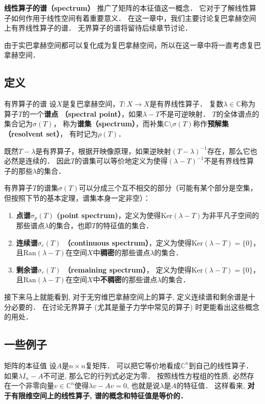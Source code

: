 
\textbf{线性算子的谱（spectrum）} 推广了矩阵的本征值这一概念． 它对于了解线性算子如何作用于线性空间有着重要意义． 在这一章中，我们主要讨论复巴拿赫空间上有界线性算子的谱． 无界算子的谱将留待后续章节讨论．

由于实巴拿赫空间都可以复化成为复巴拿赫空间，所以在这一章中将一直考虑复巴拿赫空间．

\subsection{定义}
\begin{definition}{有界算子的谱}
设$X$是复巴拿赫空间，$T:X\to X$是有界线性算子． 复数$\lambda\in\mathbb{C}$称为算子$T$的一个\textbf{谱点 （spectral point）}，如果$\lambda-T$不是可逆映射． $T$的全体谱点的集合记为$\sigma(T)$， 称为\textbf{谱集（spectrum）}，而补集$\mathbb{C}\setminus\sigma(T)$称作\textbf{预解集（resolvent set）}， 有时记为$\rho(T)$．
\end{definition}

既然$T-\lambda$是有界算子，根据开映像原理，如果逆映射$(T-\lambda)^{-1}$存在，那么它也必然是连续的． 因此$T$的谱集可以等价地定义为使得$(\lambda-T)^{-1}$不是有界线性算子的那些$\lambda$的集合．

有界算子$T$的谱集$\sigma(T)$可以分成三个互不相交的部分（可能有某个部分是空集，但按照下节的基本定理，谱集本身一定非空）：

\begin{enumerate}
\item \textbf{点谱$\sigma_p(T)$ (point spectrum)}，定义为使得$\text{Ker}(\lambda-T)$为非平凡子空间的那些谱点$\lambda$的集合，也即$T$的特征值的集合．

\item \textbf{连续谱$\sigma_c(T)$ （continuous spectrum）}，定义为使得$\text{Ker}(\lambda-T)=\{0\}$，且$\text{Ran}(\lambda-T)$在空间$X$中\textbf{稠密}的那些谱点$\lambda$的集合．

\item \textbf{剩余谱$\sigma_r(T)$ （remaining spectrum）}， 定义为使得$\text{Ker}(\lambda-T)=\{0\}$，且$\text{Ran}(\lambda-T)$在空间$X$中\textbf{不稠密}的那些谱点$\lambda$的集合．
\end{enumerate}

接下来马上就能看到, 对于无穷维巴拿赫空间上的算子, 定义连续谱和剩余谱是十分必要的． 在讨论无界算子 (尤其是量子力学中常见的算子) 时更能看出这些概念的用处．

\subsection{一些例子}
\begin{example}{矩阵的本征值}
设$A$是$n\times n$复矩阵． 可以把它等价地看成$\mathbb{C}^n$到自己的线性算子． 如果$\lambda I_n-A$不可逆, 那么它的行列式必定为零． 按照线性方程组的性质, 必然存在一个非零向量$v\in \mathbb{C}^n$使得$\lambda v-Av=0$, 也就是说$\lambda$是$A$的特征值． 这样看来, \textbf{对于有限维空间上的线性算子, 谱的概念和特征值是等价的．}
\end{example}

